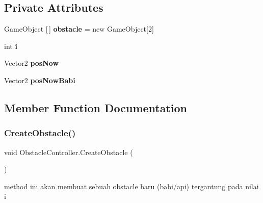 \subsection*{Private Attributes}
\begin{DoxyCompactItemize}
\item 
\hypertarget{class_obstacle_controller_a2f1cb4b6681d630286032d9ad3446342}{}\label{class_obstacle_controller_a2f1cb4b6681d630286032d9ad3446342} 
Game\+Object \mbox{[}$\,$\mbox{]} {\bfseries obstacle} = new Game\+Object\mbox{[}2\mbox{]}
\item 
\hypertarget{class_obstacle_controller_acec4d4decf5a2e54b41db74c15378396}{}\label{class_obstacle_controller_acec4d4decf5a2e54b41db74c15378396} 
int {\bfseries i}
\item 
\hypertarget{class_obstacle_controller_a80abe8f0b50a4dbede423349a1cc4a3a}{}\label{class_obstacle_controller_a80abe8f0b50a4dbede423349a1cc4a3a} 
Vector2 {\bfseries pos\+Now}
\item 
\hypertarget{class_obstacle_controller_a8cbe87dc8debfacb1afe0b41d0881c3e}{}\label{class_obstacle_controller_a8cbe87dc8debfacb1afe0b41d0881c3e} 
Vector2 {\bfseries pos\+Now\+Babi}
\end{DoxyCompactItemize}


\subsection{Member Function Documentation}
\hypertarget{class_obstacle_controller_ac4ade82f15fed22429690b7f20aee930}{}\label{class_obstacle_controller_ac4ade82f15fed22429690b7f20aee930} 
\subsubsection{\texorpdfstring{Create\+Obstacle()}{CreateObstacle()}}
{\footnotesize\ttfamily void Obstacle\+Controller.\+Create\+Obstacle (\begin{DoxyParamCaption}{ }\end{DoxyParamCaption})\hspace{0.3cm}{\ttfamily [private]}}



method ini akan membuat sebuah obstacle baru (babi/api) tergantung pada nilai i 

\hypertarget{class_obstacle_controller_a2d1939f5e5a56507a9b0cdcfe70b38f9}{}\label{class_obstacle_controller_a2d1939f5e5a56507a9b0cdcfe70b38f9} 
